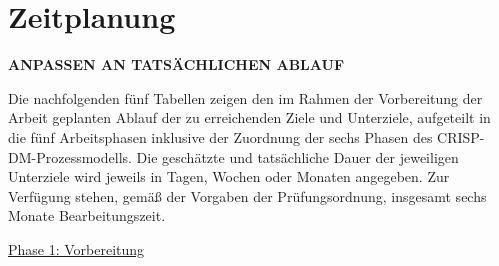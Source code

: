 \section{Zeitplanung}
\label{timecourse}

\textbf{ANPASSEN AN TATSÄCHLICHEN ABLAUF}

Die nachfolgenden fünf Tabellen zeigen den im Rahmen der Vorbereitung der Arbeit geplanten Ablauf der zu erreichenden Ziele und Unterziele, aufgeteilt in die fünf Arbeitsphasen inklusive der Zuordnung der sechs Phasen des CRISP-DM-Prozessmodells. Die geschätzte und tatsächliche Dauer der jeweiligen Unterziele wird jeweils in Tagen, Wochen oder Monaten angegeben. Zur Verfügung stehen, gemäß der Vorgaben der Prüfungsordnung, insgesamt sechs Monate Bearbeitungszeit.

\underline{Phase 1: Vorbereitung}
